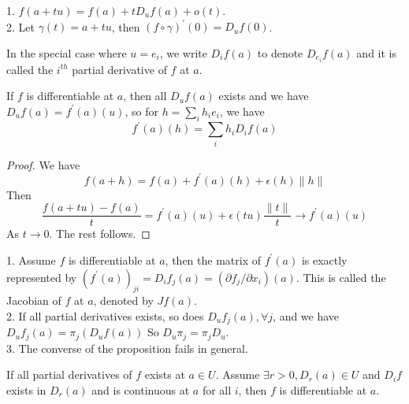 \begin{remark}
    1. $f(a+tu)=f(a)+tD_uf(a)+o(t)$.\\
    2. Let $\gamma(t)=a+tu$, then $(f\circ\gamma)^\prime(0)=D_uf(0)$.
\end{remark}
In the special case where $u=e_i$, we write $D_if(a)$ to denote $D_{e_i}f(a)$ and it is called the $i^{th}$ partial derivative of $f$ at $a$.
\begin{proposition}
    If $f$ is differentiable at $a$, then all $D_uf(a)$ exists and we have $D_uf(a)=f^\prime(a)(u)$, so for $h=\sum_ih_ie_i$, we have
    $$f^\prime(a)(h)=\sum_ih_iD_if(a)$$
\end{proposition}
\begin{proof}
    We have
    $$f(a+h)=f(a)+f^\prime(a)(h)+\epsilon(h)\|h\|$$
    Then
    $$\frac{f(a+tu)-f(a)}{t}=f^\prime(a)(u)+\epsilon(tu)\frac{\|t\|}{t}\to f^\prime(a)(u)$$
    As $t\to 0$.
    The rest follows.
\end{proof}
\begin{remark}
    1. Assume $f$ is differentiable at $a$, then the matrix of $f^\prime(a)$ is exactly represented by $(f^\prime(a))_{ji}=D_if_j(a)=(\partial f_j/\partial x_i)(a)$.
    This is called the Jacobian of $f$ at $a$, denoted by $Jf(a)$.\\
    2. If all partial derivatives exists, so does $D_uf_j(a),\forall j$, and we have $D_uf_j(a)=\pi_j(D_uf(a))$
    So $D_u\pi_j=\pi_jD_u$.\\
    3. The converse of the proposition fails in general.
\end{remark}
\begin{theorem}
    If all partial derivatives of $f$ exists at $a\in U$.
    Assume $\exists r>0,D_r(a)\in U$ and $D_if$ exists in $D_r(a)$ and is continuous at $a$ for all $i$, then $f$ is differentiable at $a$.
\end{theorem}
